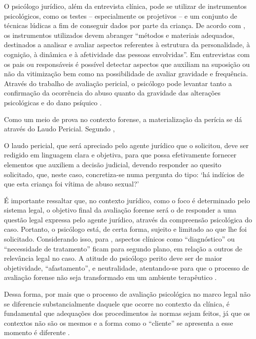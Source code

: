 O psicólogo jurídico, além da entrevista clínica, pode se utilizar de instrumentos psicológicos, como os testes -- especialmente os projetivos -- e um conjunto de técnicas lúdicas a fim de conseguir dados por parte da criança. De acordo com , os instrumentos utilizados devem abranger ``métodos e materiais adequados, destinados a analisar e avaliar aspectos referentes à estrutura da personalidade, à cognição, à dinâmica e à afetividade das pessoas envolvidas''. Em entrevistas com os pais ou responsáveis é possível detectar aspectos que auxiliam na suposição ou não da vitimização bem como na possibilidade de avaliar gravidade e frequência. 	Através do trabalho de avaliação pericial, o psicólogo pode levantar tanto a confirmação da ocorrência do abuso quanto da gravidade das alterações psicológicas e do dano psíquico \cite{JUNG2006}. 

Como um meio de prova no contexto forense, a materialização da perícia se dá através do Laudo Pericial. Segundo ,

\begin{citacao}
	O laudo pericial, que será apreciado pelo agente jurídico que o solicitou, deve ser redigido em linguagem clara e objetiva, para que possa efetivamente fornecer elementos que auxiliem a decisão judicial, devendo responder ao quesito solicitado, que, neste caso, concretiza-se numa pergunta do tipo: `há indícios de que esta criança foi vítima de abuso sexual?'
\end{citacao}

É importante ressaltar que, no contexto jurídico, como o foco é determinado pelo sistema legal, o objetivo final da avaliação forense será o de responder a uma questão legal expressa pelo agente jurídico, através da compreensão psicológica do caso. Portanto, o psicólogo está, de certa forma, sujeito e limitado ao que lhe foi solicitado. Considerando isso, para , aspectos clínicos como ``diagnóstico'' ou ``necessidade de tratamento'' ficam para segundo plano, em relação a outros de relevância legal no caso. A atitude do psicólogo perito deve ser de maior objetividade, ``afastamento'', e neutralidade, atentando-se para que o processo de avaliação forense não seja transformado em um ambiente terapêutico \cite[p. 44]{ROVINSKI2004}.	

Dessa forma, por mais que o processo de avaliação psicológica no marco legal não se diferencie substancialmente daquele que ocorre no contexto da clínica, é fundamental que adequações dos procedimentos às normas sejam feitos, já que os contextos não são os mesmos e a forma como o ``cliente'' se apresenta a esse momento é diferente \cite[p. 42]{ROVINSKI2004}.

